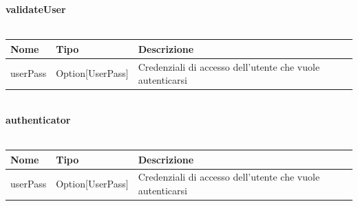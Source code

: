 \documentclass{scalatekids-article}
\begin{document}
\textbf{validateUser}\\ \\
\begin{tabular}{| l | l | l |}
  \hline
  Nome & Tipo & Descrizione\\
  \hline
  userPass & Option[UserPass] & Credenziali di accesso dell'utente che vuole autenticarsi\\
  \hline
\end{tabular}\\

\textbf{authenticator}\\ \\
\begin{tabular}{| l | l | l |}
  \hline
  Nome & Tipo & Descrizione\\
  \hline
  userPass & Option[UserPass] & Credenziali di accesso dell'utente che vuole autenticarsi\\
  \hline
\end{tabular}\\







\end{document}
